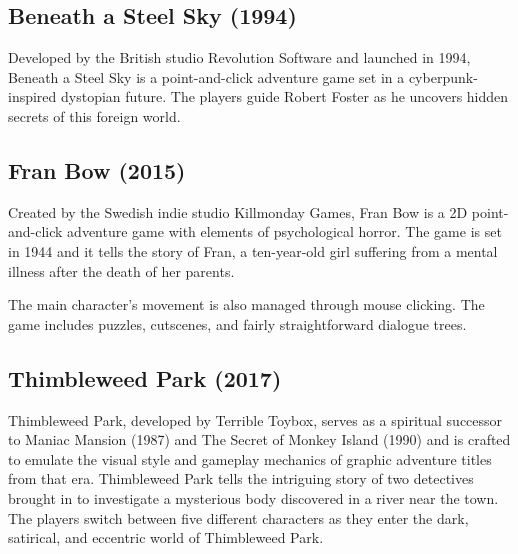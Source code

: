 \subsection{Beneath a Steel Sky (1994)}
Developed by the British studio Revolution Software and launched in 1994, Beneath a Steel Sky is a point-and-click adventure game set in a cyberpunk-inspired dystopian future. The players guide Robert Foster as he uncovers hidden secrets of this foreign world.


\subsection{Fran Bow (2015)}
Created by the Swedish indie studio Killmonday Games, Fran Bow is a 2D point-and-click adventure game with elements of psychological horror. The game is set in 1944 and it tells the story of Fran, a ten-year-old girl suffering from a mental illness after the death of her parents.

The main character's movement is also managed through mouse clicking. The game includes puzzles, cutscenes, and fairly straightforward dialogue trees.




\subsection{Thimbleweed Park (2017)}
Thimbleweed Park, developed by Terrible Toybox, serves as a spiritual successor to Maniac Mansion (1987) and The Secret of Monkey Island (1990) and is crafted to emulate the visual style and gameplay mechanics of graphic adventure titles from that era. Thimbleweed Park tells the intriguing story of two detectives brought in to investigate a mysterious body discovered in a river near the town. The players switch between five different characters as they enter the dark, satirical, and eccentric world of Thimbleweed Park\cite{Matulef2014}.


